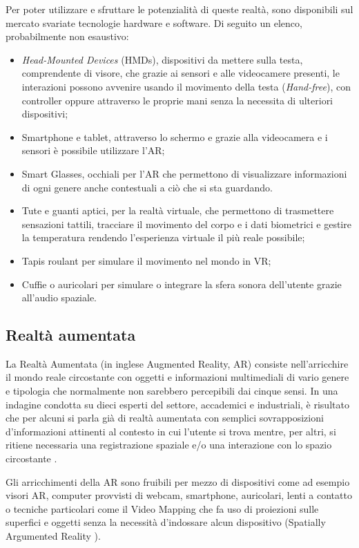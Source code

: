 Per poter utilizzare e sfruttare le potenzialità di queste realtà, sono disponibili sul mercato svariate tecnologie hardware e software. Di seguito un elenco, probabilmente non esaustivo:

\begin{itemize}
    \itemsep0.5em
    \item \textit{Head-Mounted Devices} (HMDs), dispositivi da mettere sulla testa, comprendente di visore, che grazie ai sensori e alle videocamere presenti, le interazioni possono avvenire usando il movimento della testa (\textit{Hand-free}), con controller oppure  attraverso le proprie mani senza la necessita di ulteriori dispositivi;
    \item Smartphone e tablet, attraverso lo schermo e grazie alla videocamera e i sensori è possibile utilizzare l'AR;
    \item Smart Glasses, occhiali per l'AR che permettono di visualizzare informazioni di ogni genere anche contestuali a ciò che si sta guardando.
    \item Tute e guanti aptici, per la realtà virtuale, che permettono di trasmettere sensazioni tattili, tracciare il movimento del corpo e i dati biometrici e gestire la temperatura rendendo l'esperienza virtuale il più reale possibile;
    \item Tapis roulant per simulare il movimento nel mondo in VR;
    \item Cuffie o auricolari per simulare o integrare la sfera sonora dell'utente grazie all'audio spaziale.
\end{itemize}

\subsection{Realtà aumentata}
\label{sec:ar}
La Realtà Aumentata (in inglese Augmented Reality, AR) consiste nell'arricchire il mondo reale circostante con oggetti e informazioni multimediali di vario genere e tipologia che normalmente non sarebbero percepibili dai cinque sensi.
In una indagine condotta su dieci esperti del settore, accademici e industriali, è risultato che per alcuni si parla già di realtà aumentata con semplici sovrapposizioni d'informazioni attinenti al contesto in cui l'utente si trova mentre, per altri, si ritiene necessaria una registrazione spaziale e/o una interazione con lo spazio circostante \cite[ Capitolo 4, What is AR?]{whatMR}.

Gli arricchimenti della AR sono fruibili per mezzo di dispositivi come ad esempio visori AR, computer provvisti di webcam, smartphone, auricolari, lenti a contatto o tecniche particolari come il Video Mapping che fa uso di proiezioni sulle superfici e oggetti senza la necessità d'indossare alcun dispositivo (Spatially Argumented Reality \cite{Raskar1999SpatiallyAR}).

